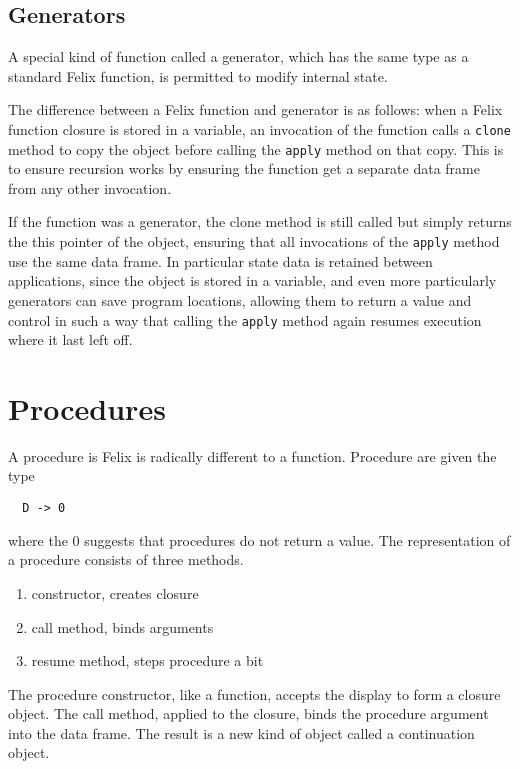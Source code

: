 \documentclass[oneside]{book}
\begin{document}
\subsection{Generators}
A special kind of function called a generator, which has the same type
as a standard Felix function, is permitted to modify internal state.

The difference between a Felix function and generator is as follows:
when a Felix function closure is stored in a variable, an invocation of the function
calls a \verb$clone$ method to copy the object before calling the \verb$apply$ method
on that copy. This is to ensure recursion
works by ensuring the function get a separate data frame from any other
invocation.

If the function was a generator, the clone method is still called but simply
returns the this pointer of the object, ensuring that all invocations
of the \verb$apply$ method use the same data frame. In particular state
data is retained between applications, since the object is stored in a variable,
and even more particularly generators can save program locations, allowing them
to return a value and control in such a way that calling the \verb$apply$ method
again resumes execution where it last left off.


\section{Procedures}

A procedure is Felix is radically different to a function. Procedure are given the type

\begin{verbatim}
  D -> 0
\end{verbatim}

where the 0 suggests that procedures do not return a value. The representation of a procedure
consists of three methods.

\begin{enumerate}
\item constructor, creates closure
\item call method, binds arguments
\item resume method, steps procedure a bit
\end{enumerate}

The procedure constructor, like a function, accepts the display to form a closure object.
The call method, applied to the closure, binds the procedure argument into the data frame.
The result is a new kind of object called a continuation object.
\end{document}
